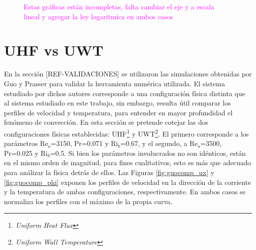 \begin{figure}[H]
  \centering
  \caption{\textcolor{magenta}{Estas gráficas están incompletas, falta cambiar el eje y a escala lineal y agregar la ley logaritmica en ambos casos}}
  \label{fig:Re5000-Pr071}
\end{figure}




\section{UHF vs UWT}

En la sección [REF-VALIDACIONES] se utilizaron las simulaciones obtenidas por Guo y Prasser \cite{guo2022direct} para validar la herramienta numérica utilizada. El sistema estudiado por dichos autores corresponde a una configuración física distinta que al sistema estudiado en este trabajo, sin embargo, resulta útil comparar los perfiles de velocidad y temperatura, para entender en mayor profundidad el fenómeno de convección. En esta sección se pretende cotejar las dos configuraciones físicas establecidas: UHF\footnote{\textit{Uniform Heat Flux}} y UWT\footnote{\textit{Uniform Wall Temperature}}. El primero corresponde a los parámetros Re$_o$=3150, Pr=0.071 y Ri$_b$=0.67, y el segundo, a Re$_o$=3500, Pr=0.025 y Ri$_b$=0.5. Si bien los parámetros involucrados no son idénticos, están en el mismo orden de magnitud, para fines cualitativos, esto es más que adecuado para análizar la física detrás de ellos. Las Figuras \ref{fig:guocomp_ux} y \ref{fig:guocomp_phi} exponen los perfiles de velocidad en la dirección de la corriente y la temperatura de ambas configuraciones, respectivamente. En ambos casos se normaliza los perfiles con el máximo de la propia curva.  

